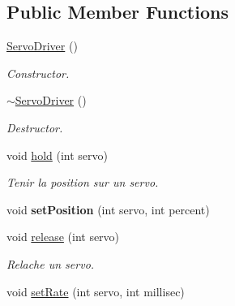 \subsection*{Public Member Functions}
\begin{DoxyCompactItemize}
\item 
\mbox{\label{classServoDriver_a2076bae148e26ee3f854f1f1984d9714}} 
\hyperlink{classServoDriver_a2076bae148e26ee3f854f1f1984d9714}{Servo\+Driver} ()
\begin{DoxyCompactList}\small\item\em Constructor. \end{DoxyCompactList}\item 
\mbox{\label{classServoDriver_acf6cad7d5b891fbe4ff44eaec8409db7}} 
\hyperlink{classServoDriver_acf6cad7d5b891fbe4ff44eaec8409db7}{$\sim$\+Servo\+Driver} ()
\begin{DoxyCompactList}\small\item\em Destructor. \end{DoxyCompactList}\item 
\mbox{\label{classServoDriver_af580283b3d1765c9a27276e9a870cf88}} 
void \hyperlink{classServoDriver_af580283b3d1765c9a27276e9a870cf88}{hold} (int servo)
\begin{DoxyCompactList}\small\item\em Tenir la position sur un servo. \end{DoxyCompactList}\item 
\mbox{\label{classServoDriver_aa9fd898a3e7de526015846f79309dca5}} 
void {\bfseries set\+Position} (int servo, int percent)
\item 
\mbox{\label{classServoDriver_aa1040b0db7ed851aec70a122301fe665}} 
void \hyperlink{classServoDriver_aa1040b0db7ed851aec70a122301fe665}{release} (int servo)
\begin{DoxyCompactList}\small\item\em Relache un servo. \end{DoxyCompactList}\item 
\mbox{\label{classServoDriver_a27d45f075f5fb2333937ab253a8cce6c}} 
void \hyperlink{classServoDriver_a27d45f075f5fb2333937ab253a8cce6c}{set\+Rate} (int servo, int millisec)

\end{DoxyCompactItemize}
